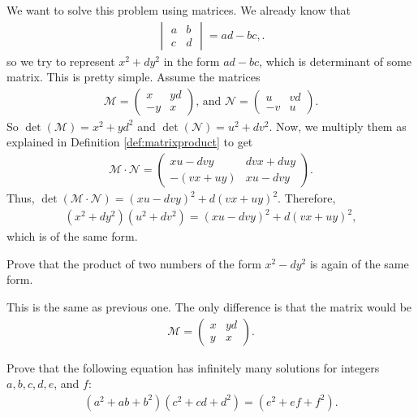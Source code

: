 \documentclass{subfile}
\begin{document}
\begin{solution}
We want to solve this problem using matrices. We already know that 
	\begin{align*}
	\begin{vmatrix}
	a&b\\
	c&d
	\end{vmatrix} = ad-bc,
	.\end{align*}
so we try to represent $x^2+dy^2$ in the form $ad-bc$, which is determinant of some matrix. This is pretty simple. Assume the matrices
\begin{align*}
\mathcal{M}=\begin{pmatrix}
x & yd\\
-y & x
\end{pmatrix} \text{, and }
\mathcal{N}=\begin{pmatrix}
u & vd\\
-v & u
\end{pmatrix}.
\end{align*}
So $\det(\mathcal M)=x^2+yd^2$ and $\det(\mathcal{N})=u^2+dv^2$.
Now, we multiply them as explained in Definition \eqref{def:matrixproduct} to get
\begin{align*}
\mathcal{M}\cdot\mathcal{N}=\begin{pmatrix}
xu-dvy & dvx+duy\\
-(vx+uy) & xu-dvy
\end{pmatrix}.
\end{align*}
Thus, $\det(\mathcal{M \cdot N})=(xu-dvy)^2+d(vx+uy)^2$. Therefore, 
\begin{align*}
(x^2+dy^2)(u^2+dv^2)=(xu-dvy)^2+d(vx+uy)^2,
\end{align*}
which is of the same form.
\end{solution}

\begin{problem}
Prove that the product of two numbers of the form $x^2-dy^2$ is again of the same form.
\end{problem}

\begin{solution}
This is the same as previous one. The only difference is that the matrix would be
\begin{align*}
\mathcal{M}=\begin{pmatrix}
x & yd\\
y & x
\end{pmatrix}.
\end{align*}
\end{solution}

\begin{problem}
Prove that the following equation has infinitely many solutions for integers $a,b,c,d,e$, and $f$:
\begin{align*}
(a^2+ab+b^2)(c^2+cd+d^2)=(e^2+ef+f^2).
\end{align*}
\end{problem}
\end{document}
